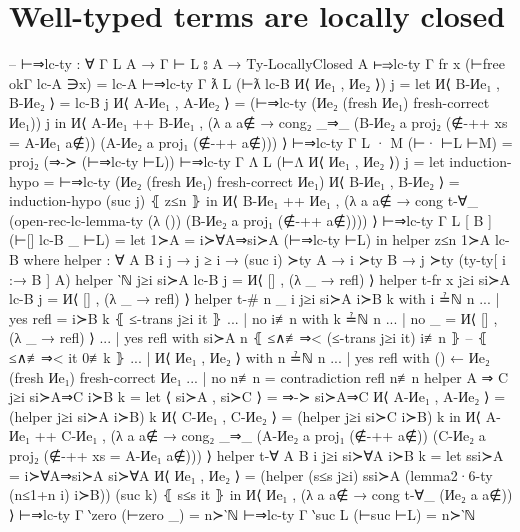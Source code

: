 \documentclass[logo,bsc,singlespacing,parskip,online]{infthesis}
\begin{document}
\section{Well-typed terms are locally closed}
\label{appendix:f_well_typed_lc}
\begin{code}
  -- ⊢⇒lc-ty : ∀ {Γ L A} → Γ ⊢ L ⦂ A → Ty-LocallyClosed A
  ⊢⇒lc-ty {Γ} {fr x} (⊢free okΓ lc-A ∋x) = lc-A
  ⊢⇒lc-ty {Γ} {ƛ L} (⊢ƛ lc-B И⟨ Иe₁ , Иe₂ ⟩) j =
    let И⟨ B-Иe₁ , B-Иe₂ ⟩ = lc-B j
        И⟨ A-Иe₁ , A-Иe₂ ⟩ =
          (⊢⇒lc-ty (Иe₂ (fresh Иe₁) {fresh-correct Иe₁})) j
    in И⟨ A-Иe₁ ++ B-Иe₁ , (λ a {a∉} → cong₂ _⇒_
      (B-Иe₂ a {proj₂ (∉-++ {xs = A-Иe₁} a∉)})
      (A-Иe₂ a {proj₁ (∉-++ a∉)})) ⟩
  ⊢⇒lc-ty {Γ} {L · M} (⊢· ⊢L ⊢M) = proj₂ (⇒-≻ (⊢⇒lc-ty ⊢L))
  ⊢⇒lc-ty {Γ} {Λ L} (⊢Λ И⟨ Иe₁ , Иe₂ ⟩) j =
    let induction-hypo = ⊢⇒lc-ty (Иe₂ (fresh Иe₁) {fresh-correct Иe₁})
        И⟨ B-Иe₁ , B-Иe₂ ⟩ = induction-hypo (suc j) ⦃ z≤n ⦄
    in И⟨ B-Иe₁ ++ Иe₁ , (λ a {a∉} → cong t-∀_
      (open-rec-lc-lemma-ty
        (λ ())
        (B-Иe₂ a {proj₁ (∉-++ a∉)}))) ⟩
  ⊢⇒lc-ty {Γ} {L [ B ]} (⊢[] lc-B _ ⊢L) =
    let 1≻A = i≻∀A⇒si≻A (⊢⇒lc-ty ⊢L)
    in helper z≤n 1≻A lc-B
    where
      helper : ∀ {A B i j}
        → j ≥ i
        → (suc i) ≻ty A
        → i ≻ty B → j ≻ty (ty-ty[ i :→ B ] A)
      helper {‵ℕ} j≥i si≻A lc-B j = И⟨ [] , (λ _ → refl) ⟩
      helper {t-fr x} j≥i si≻A lc-B j = И⟨ [] , (λ _ → refl) ⟩
      helper {t-# n} {_} {i} j≥i si≻A i≻B k with i ≟ℕ n
      ... | yes refl = i≻B k ⦃ ≤-trans j≥i it ⦄
      ... | no  i≢n  with k ≟ℕ n
      ...   | no  _    = И⟨ [] , (λ _ → refl) ⟩
      ...   | yes refl with si≻A n ⦃ ≤∧≢⇒< (≤-trans j≥i it) i≢n ⦄ -- ⦃ ≤∧≢⇒< it 0≢k ⦄
      ...     | И⟨ Иe₁ , Иe₂ ⟩ with n ≟ℕ n
      ...       | yes refl with () ← Иe₂ (fresh Иe₁) {fresh-correct Иe₁}
      ...       | no  n≢n =  contradiction refl n≢n
      helper {A ⇒ C} j≥i si≻A⇒C i≻B k =
        let ⟨ si≻A , si≻C ⟩ = ⇒-≻ si≻A⇒C
            И⟨ A-Иe₁ , A-Иe₂ ⟩ = (helper j≥i si≻A i≻B) k
            И⟨ C-Иe₁ , C-Иe₂ ⟩ = (helper j≥i si≻C i≻B) k
        in И⟨ A-Иe₁ ++ C-Иe₁ , (λ a {a∉} → cong₂ _⇒_
          (A-Иe₂ a {proj₁ (∉-++ a∉)})
          (C-Иe₂ a {proj₂ (∉-++ {xs = A-Иe₁} a∉)})) ⟩
      helper {t-∀ A} {B} {i} j≥i si≻∀A i≻B k =
        let ssi≻A = i≻∀A⇒si≻A si≻∀A
            И⟨ Иe₁ , Иe₂ ⟩ = (helper (s≤s j≥i) ssi≻A (lemma2·6-ty (n≤1+n i) i≻B)) (suc k) ⦃ s≤s it ⦄
        in И⟨ Иe₁ , (λ a {a∉} → cong t-∀_ (Иe₂ a {a∉})) ⟩
  ⊢⇒lc-ty {Γ} {‵zero} (⊢zero _) = n≻‵ℕ
  ⊢⇒lc-ty {Γ} {‵suc L} (⊢suc ⊢L) = n≻‵ℕ


\end{code}
\end{document}

